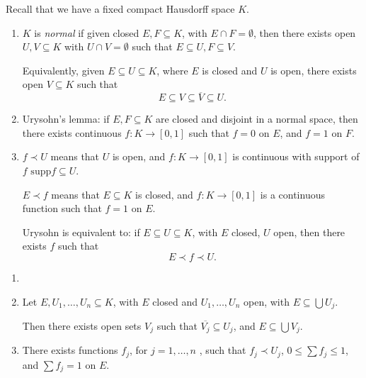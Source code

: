 \documentclass[12pt]{article}
\begin{document}
Recall that we have a fixed compact Hausdorff space $K$.
\begin{enumerate}
	\item $K$ is \emph{normal} if given closed $E, F \subseteq K$, with $E \cap F = \emptyset$, then there exists open $U, V \subseteq K$ with $U \cap V = \emptyset$ such that $E \subseteq U, F \subseteq V$.

		Equivalently, given $E \subseteq U \subseteq K$, where $E$ is closed and $U$ is open, there exists open $V \subseteq K$ such that
		\[
		E \subseteq V \subseteq \overline{V} \subseteq U.
		\]
	\item Urysohn's lemma: if $E, F \subseteq K$ are closed and disjoint in a normal space, then there exists continuous $f : K \to [0, 1]$ such that $f = 0$ on $E$, and $f = 1$ on $F$.
	\item $f \prec U$ means that $U$ is open, and $f : K \to [0, 1]$ is continuous with support of $f$ $\mathrm{supp} f \subseteq U$.

		$E \prec f$ means that $E \subseteq K$ is closed, and $f : K \to [0, 1]$ is a continuous function such that $f = 1$ on $E$.

		Urysohn is equivalent to: if $E \subseteq U \subseteq K$, with $E$ closed, $U$ open, then there exists $f$ such that
		\[
		E \prec f \prec U.
		\]
\end{enumerate}

\begin{lemma}
	\begin{enumerate}[\normalfont(i)]
		\item[]
		\item Let $E, U_1, \ldots, U_n \subseteq K$, with $E$ closed and $U_1, \ldots, U_n$ open, with $E \subseteq \bigcup U_j$.

			Then there exists open sets $V_j$ such that $\overline{V_j} \subseteq U_j$, and $E \subseteq \bigcup V_j$.
		\item There exists functions $f_j$, for $j = 1, \ldots, n$ , such that $f_j \prec U_j$, $0 \leq \sum f_j \leq 1$, and $\sum f_j = 1$ on $E$.
	\end{enumerate}
\end{lemma}


\end{document}
